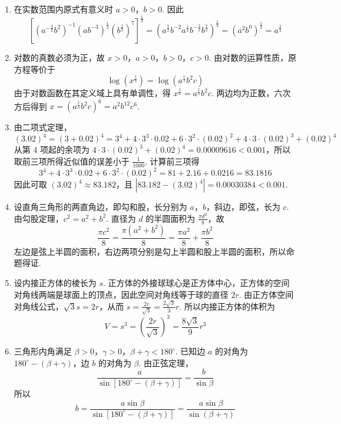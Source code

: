 \documentclass[UTF8,a4paper,oneside,11pt]{ctexbook}
\begin{document}
\begin{solution}
\begin{enumerate}
\item 在实数范围内原式有意义时 \(a>0\)，\(b>0\). 因此
\[
\left[\left(a^{-\frac{3}{2}}b^{2}\right)^{-1}\left(ab^{-3}\right)^{\frac{1}{2}}\left(b^{\frac{1}{2}}\right)^{7}\right]^{\frac{1}{3}}
=\left(a^{\frac{3}{2}}b^{-2}a^{\frac{1}{2}}b^{-\frac{3}{2}}b^{\frac{7}{2}}\right)^{\frac{1}{3}}
=\left(a^{2}b^{0}\right)^{\frac{1}{3}}=a^{\frac{2}{3}}
\]

\item 对数的真数必须为正，故 \(x>0\)，\(a>0\)，\(b>0\)，\(c>0\). 由对数的运算性质，原方程等价于
\[
\log\left(x^{\frac{1}{6}}\right)=\log\left(a^{\frac{1}{3}}b^{2}c\right)
\]
由于对数函数在其定义域上具有单调性，得 \(x^{\frac{1}{6}}=a^{\frac{1}{3}}b^{2}c\). 两边均为正数，六次方后得到 \(x=\left(a^{\frac{1}{3}}b^{2}c\right)^{6}=a^{2}b^{12}c^{6}\).

\item 由二项式定理，
\[
\left(3.02\right)^{4}=\left(3+0.02\right)^{4}
=3^{4}+4\cdot3^{3}\cdot0.02+6\cdot3^{2}\cdot\left(0.02\right)^{2}
+4\cdot3\cdot\left(0.02\right)^{3}+\left(0.02\right)^{4}
\]
从第 4 项起的余项为 \(4\cdot3\cdot\left(0.02\right)^{3}+\left(0.02\right)^{4}=0.00009616<0.001\)，所以取前三项所得近似值的误差小于 \(\frac{1}{1000}\). 计算前三项得
\[
3^{4}+4\cdot3^{3}\cdot0.02+6\cdot3^{2}\cdot\left(0.02\right)^{2}=81+2.16+0.0216=83.1816
\]
因此可取 \(\left(3.02\right)^{4}\approx83.182\)，且 \(\left|83.182-\left(3.02\right)^{4}\right|=0.00030384<0.001\).

\item 设直角三角形的两直角边，即勾和股，长分别为 \(a\)，\(b\)，斜边，即弦，长为 \(c\). 由勾股定理，\(c^{2}=a^{2}+b^{2}\). 直径为 \(d\) 的半圆面积为 \(\frac{\pi d^{2}}{8}\)，故
\[
\frac{\pi c^{2}}{8}=\frac{\pi\left(a^{2}+b^{2}\right)}{8}=\frac{\pi a^{2}}{8}+\frac{\pi b^{2}}{8}
\]
左边是弦上半圆的面积，右边两项分别是勾上半圆和股上半圆的面积，所以命题得证.

\item 设内接正方体的棱长为 \(s\). 正方体的外接球球心是正方体中心，正方体的空间对角线两端是球面上的顶点，因此空间对角线等于球的直径 \(2r\). 由正方体空间对角线公式，\(\sqrt{3}s=2r\)，从而 \(s=\frac{2r}{\sqrt{3}}=\frac{2\sqrt{3}}{3}r\). 所以内接正方体的体积为
\[
V=s^{3}=\left(\frac{2r}{\sqrt{3}}\right)^{3}=\frac{8\sqrt{3}}{9}r^{3}
\]

\item 三角形内角满足 \(\beta>0\)，\(\gamma>0\)，\(\beta+\gamma<180^{\circ}\). 已知边 \(a\) 的对角为 \(180^{\circ}-\left(\beta+\gamma\right)\)，边 \(b\) 的对角为 \(\beta\). 由正弦定理，
\[
\frac{a}{\sin\left[180^{\circ}-\left(\beta+\gamma\right)\right]}=\frac{b}{\sin\beta}
\]
所以
\[
b=\frac{a\sin\beta}{\sin\left[180^{\circ}-\left(\beta+\gamma\right)\right]}=\frac{a\sin\beta}{\sin\left(\beta+\gamma\right)}
\]
\end{enumerate}
\end{solution}
\end{document}
